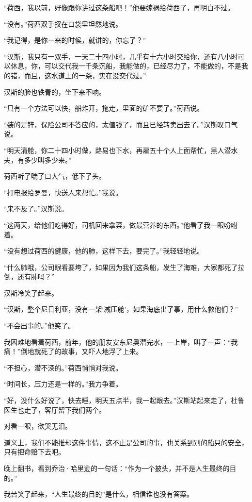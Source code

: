 \par “荷西，我以前，好像跟你讲过这条船吧！”他要嫁祸给荷西了，再明白不过。
\par “没有。”荷西双手扠在口袋里坦然地说。
\par “我记得，是你一来的时候，就讲的，你忘了？”
\par “汉斯，我只有一双手，一天二十四小时，几乎有十六小时交给你，还有八小时可以休息，你，可以交代我一千条沉船，我能做的，已经尽力了，不能做的，不是我的错，而且，这水道上的一条，实在没交代过。”
\par 汉斯的脸也铁青的，坐下来不响。
\par “只有一个方法可以快，船炸开，拖走，里面的矿不要了。”荷西说。
\par “装的是锌，保险公司不答应的，太值钱了，而且已经转卖出去了。”汉斯叹口气说。
\par “明天清舱，你二十四小时做，路易也下水，再雇五十个人上面帮忙，黑人潜水夫，有多少叫多少来。”
\par 荷西听了喘了口大气，低下了头。
\par “打电报给罗曼，快送人来帮忙。”我说。
\par “来不及了。”汉斯说。
\par “这两天，给他们吃得好，司机回来拿菜，做最营养的东西。”他看了我一眼吩咐着。
\par “没有想过荷西的健康，他的肺，这样下去，要完了。”我轻轻地说。
\par “什么肺哦，公司眼看要垮了，如果因为我们这条船，发生了海难，大家都死了拉倒，还有肺吗？”
\par 汉斯冷笑了起来。
\par “汉斯，整个尼日利亚，没有一架‘减压舱’，如果海底出了事，用什么救他们？”
\par “不会出事的。”他笑了。
\par 我困难地看着荷西，前年，他的朋友安东尼奥潜完水，一上岸，叫了一声：“我痛！”倒地就死了的故事，又吓人地浮了上来。
\par “不担心，潜不深的。”荷西悄悄对我说。
\par “时间长，压力还是一样的。”我力争着。
\par “好，没什么好说了，快去睡，明天五点半，我一起跟去。”汉斯站起来走了，杜鲁医生也走了，客厅留下我们两个。
\par 对看一眼，欲哭无泪。
\par 道义上，我们不能推却这件事情，这不止是公司的事，也关系到别的船只的安全，只有把命赔下去吧。
\par 晚上翻书，看到乔治·哈里逊的一句话：“作为一个披头，并不是人生最终的目的。”
\par 我苦笑了起来，“人生最终的目的”是什么，相信谁也没有答案。


